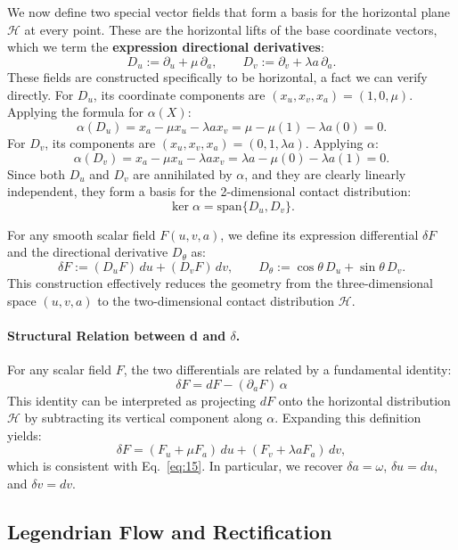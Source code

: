 We now define two special vector fields that form a basis for the horizontal plane $\mathcal{H}$ at every point. These are the horizontal lifts of the base coordinate vectors, which we term the \textbf{expression directional derivatives}:
\begin{equation}\label{eq:directional_derivatives}
D_u := \partial_u + \mu\,\partial_a, \qquad D_v := \partial_v + \lambda a\,\partial_a.
\end{equation}
These fields are constructed specifically to be horizontal, a fact we can verify directly. For $D_u$, its coordinate components are $(x_u, x_v, x_a) = (1, 0, \mu)$. Applying the formula for $\alpha(X)$:
\[
\alpha(D_u) = x_a - \mu x_u - \lambda a x_v = \mu - \mu(1) - \lambda a(0) = 0.
\]
For $D_v$, its components are $(x_u, x_v, x_a) = (0, 1, \lambda a)$. Applying $\alpha$:
\[
\alpha(D_v) = x_a - \mu x_u - \lambda a x_v = \lambda a - \mu(0) - \lambda a(1) = 0.
\]
Since both $D_u$ and $D_v$ are annihilated by $\alpha$, and they are clearly linearly independent, they form a basis for the 2-dimensional contact distribution:
\[
\ker\alpha = \text{span}\{D_u, D_v\}.
\]

For any smooth scalar field $F(u,v,a)$, we define its expression differential $\delta F$ and the directional derivative $D_\theta$ as:
\begin{equation}\label{eq:3}\tag{3}
\delta F := (D_uF)\,du + (D_vF)\,dv, \qquad D_\theta := \cos\theta\,D_u + \sin\theta\,D_v.
\end{equation}
This construction effectively reduces the geometry from the three-dimensional space $(u,v,a)$ to the two-dimensional contact distribution $\mathcal{H}$.

\paragraph{Structural Relation between d and $\delta$.}
For any scalar field $F$, the two differentials are related by a fundamental identity:
\[
\boxed{ \delta F = dF - (\partial_a F)\,\alpha }
\]
This identity can be interpreted as projecting $dF$ onto the horizontal distribution $\mathcal{H}$ by subtracting its vertical component along $\alpha$. Expanding this definition yields:
\[
\delta F = (F_u + \mu F_a)\,du + (F_v + \lambda a F_a)\,dv,
\]
which is consistent with Eq.~\eqref{eq:15}. In particular, we recover $\delta a = \omega$, $\delta u = du$, and $\delta v = dv$.

\subsection{Legendrian Flow and Rectification}

